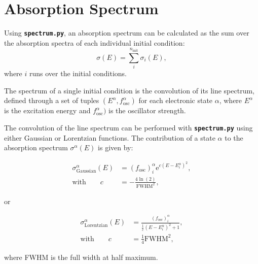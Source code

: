 \documentclass[a4paper,11pt,DIV=15,openany,twoside=false]{scrbook}
\newcommand{\tthdump}[1]{#1}
\newcommand{\ttt}[1]{\textbf{\texttt{#1}}}
\newcommand{\E}{\ensuremath{\mathrm{e}}}
\begin{document}
\section{Absorption Spectrum}\label{met:spectrum}

Using \ttt{spectrum.py}, an absorption spectrum can be calculated as the sum over the absorption spectra of each individual initial condition:
\begin{equation}
  \sigma(E)=\sum\limits_i^{n_\text{init}} \sigma_i(E),
\end{equation}
where $i$ runs over the initial conditions.

The spectrum of a single initial condition is the convolution of its line spectrum, defined through a set of tuples $(E^\alpha,f_\text{osc}^\alpha)$ for each electronic state $\alpha$, where $E^\alpha$ is the excitation energy and $f_\text{osc}^\alpha)$ is the oscillator strength.

The convolution of the line spectrum can be performed with \ttt{spectrum.py} using either Gaussian or Lorentzian functions. The contribution of a state $\alpha$ to the absorption spectrum $\sigma^\alpha(E)$ is given by:
\tthdump{
  \begin{align}
    \sigma_{\text{Gaussian}}^\alpha(E)&=
    \left(f_{\text{osc}}\right)_i^\alpha 
    \E^{c\left(E-E_i^\alpha\right)^2},\\
    \text{with}\qquad
    c&=-\frac{4\ln(2)}{\text{FWHM}^2},
  \end{align}
}
or
\tthdump{
  \begin{align}
    \sigma_{\text{Lorentzian}}^\alpha(E)&=
    \frac{\left(f_{\text{osc}}\right)_i^\alpha}{\frac{1}{c}\left(E-E_i^\alpha\right)^2+1},\\
    \text{with}\qquad
    c&=\frac{1}{4}\text{FWHM}^2,
  \end{align}
}
where FWHM is the full width at half maximum.
\end{document}
